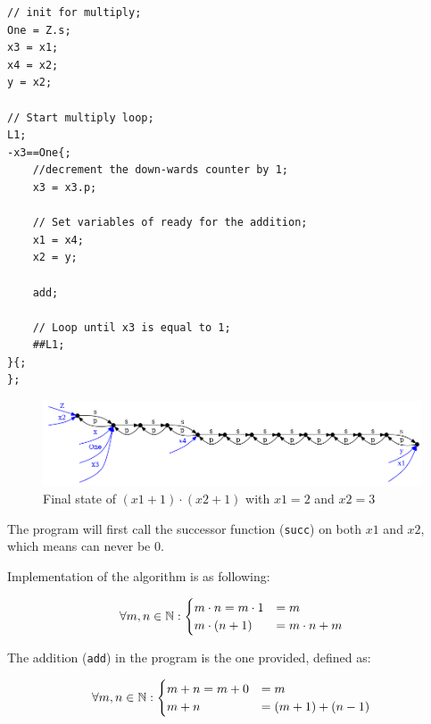 \documentclass[a4paper,12px]{article}
\begin{document}
\begin{verbatim}
// init for multiply;
One = Z.s;
x3 = x1;
x4 = x2;
y = x2;

// Start multiply loop;
L1;
-x3==One{;
    //decrement the down-wards counter by 1;
    x3 = x3.p;

    // Set variables of ready for the addition;
    x1 = x4;
    x2 = y;

    add;

    // Loop until x3 is equal to 1;
    ##L1;
}{;
};
\end{verbatim}
\begin{figure}[h]
    \centering
    \includegraphics[width=0.8\linewidth]{f3.png}
    \caption{Final state of $(x1+1)\cdot(x2+1)$ with $x1=2$ and $x2=3$}
\end{figure}
\FloatBarrier%

The program will first call the successor function (\verb|succ|) on both $x1$ and $x2$, which means can
never be 0.

Implementation of the algorithm is as following:

$$\begin{displaystyle}
    \forall m,n \in \mathbb{N}:
  \begin{cases}
      m \cdot n = m \cdot 1 & =m\\
      m \cdot (n + 1) &= m \cdot n + m
  \end{cases}
\end{displaystyle}$$

The addition (\verb|add|) in the program is the one provided, defined as:

$$\begin{displaystyle}
    \forall m,n \in \mathbb{N}:
  \begin{cases}
      m + n  = m + 0 &=m \\
      m + n  &=(m+1) + (n-1)
  \end{cases}
\end{displaystyle}$$






% 
% 
\end{document}

